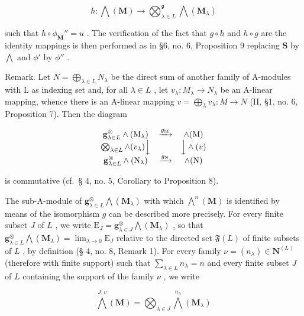 \[
h: \bigwedge (\mathbf {M}) \rightarrow \bigotimes_ {\lambda \in L} ^ {\mathfrak {g}} \bigwedge (\mathbf {M} _ {\lambda})
\]

such that \(h \circ \phi_{\mathbf{M}}'' = u\) . The verification of the fact that \(g \circ h\) and \(h \circ g\) are the identity mappings is then performed as in §6, no. 6, Proposition 9 replacing \(\mathbf{S}\) by \(\bigwedge\) and \(\phi'\) by \(\phi''\) .

Remark. Let \(N = \bigoplus_{\lambda \in L} N_{\lambda}\) be the direct sum of another family of A-modules with L as indexing set and, for all \(\lambda \in L\) , let \(v_{\lambda}: M_{\lambda} \to N_{\lambda}\) be an A-linear mapping, whence there is an A-linear mapping \(v = \bigoplus_{\lambda} v_{\lambda}: M \to N\) (II, §1, no. 6, Proposition 7). Then the diagram

\[
\begin{array}{c c c} \mathbf {g} _ {\lambda \in L} ^ {\otimes} \wedge (\mathrm{M} _ {\lambda}) & \xrightarrow {g _ {\mathrm{M}}} & \wedge (\mathrm{M}) \\ \bigotimes_ {\lambda \in L} \wedge (v _ {\lambda}) \Big \downarrow & & \Big \downarrow \wedge (v) \\ \mathbf {g} _ {\lambda \in L} ^ {\otimes} \wedge (\mathrm{N} _ {\lambda}) & \xrightarrow {g _ {\mathrm{N}}} & \wedge (\mathrm{N}) \end{array}
\]

is commutative (cf.~§ 4, no. 5, Corollary to Proposition 8).

The sub-A-module of \(\mathbf{g}_{\lambda \in L}^{\otimes} \bigwedge (\mathbf{M}_{\lambda})\) with which \(\bigwedge^{n}(\mathbf{M})\) is identified by means of the isomorphism \(g\) can be described more precisely. For every finite subset \(J\) of \(L\) , we write \(\mathrm{E}_{J} = \mathbf{g}_{\lambda \in J}^{\otimes} \bigwedge (\mathbf{M}_{\lambda})\) , so that \(\mathbf{g}_{\lambda \in L}^{\otimes} \bigwedge (\mathbf{M}_{\lambda}) = \lim_{\lambda \to 0} \mathrm{E}_{J}\) relative to the directed set \(\mathfrak{F}(L)\) of finite subsets of \(L\) , by definition (§ 4, no. 8, Remark 1). For every family \(\nu = (n_{\lambda}) \in \mathbf{N}^{(L)}\) (therefore with finite support) such that \(\sum_{\lambda \in L} n_{\lambda} = n\) and every finite subset \(J\) of \(L\) containing the support of the family \(\nu\) , we write

\[
\bigwedge^ {J, v} (\mathbf {M}) = \bigotimes_ {\lambda \in J} \bigwedge^ {n _ {\lambda}} (\mathbf {M} _ {\lambda})\tag{16}
\]

